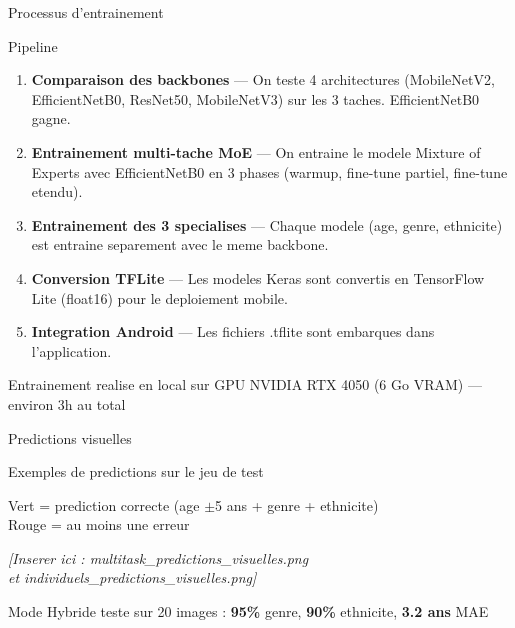 \documentclass[aspectratio=169, 12pt]{beamer}
\begin{document}
\begin{frame}{Processus d'entrainement}

\begin{block}{Pipeline}
{\small
\begin{enumerate}
\setlength{\itemsep}{4pt}
    \item \textbf{Comparaison des backbones} --- On teste 4 architectures (MobileNetV2, EfficientNetB0, ResNet50, MobileNetV3) sur les 3 taches. EfficientNetB0 gagne.
    \item \textbf{Entrainement multi-tache MoE} --- On entraine le modele Mixture of Experts avec EfficientNetB0 en 3 phases (warmup, fine-tune partiel, fine-tune etendu).
    \item \textbf{Entrainement des 3 specialises} --- Chaque modele (age, genre, ethnicite) est entraine separement avec le meme backbone.
    \item \textbf{Conversion TFLite} --- Les modeles Keras sont convertis en TensorFlow Lite (float16) pour le deploiement mobile.
    \item \textbf{Integration Android} --- Les fichiers .tflite sont embarques dans l'application.
\end{enumerate}
}
\end{block}

\vspace{0.2cm}
\centering
{\small\color{steel} Entrainement realise en local sur GPU NVIDIA RTX 4050 (6 Go VRAM) --- environ 3h au total}
\end{frame}

\begin{frame}{Predictions visuelles}

\begin{center}
{\large\color{navy} Exemples de predictions sur le jeu de test}

\vspace{0.3cm}
{\small Vert = prediction correcte (age $\pm$5 ans + genre + ethnicite)\\Rouge = au moins une erreur}

\vspace{0.5cm}
{\color{steel}\textit{[Inserer ici : multitask\_predictions\_visuelles.png\\et individuels\_predictions\_visuelles.png]}}

\vspace{0.5cm}
{\small Mode Hybride teste sur 20 images : \textbf{95\%} genre, \textbf{90\%} ethnicite, \textbf{3.2 ans} MAE}
\end{center}
\end{frame}
\end{document}
